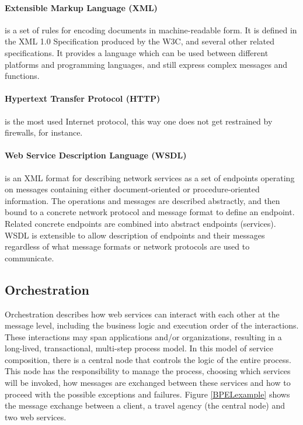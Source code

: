 \paragraph{Extensible Markup Language (XML)}
is a set of rules for encoding documents in machine-readable form. It is defined in the XML 1.0 Specification produced by the W3C, and several other related specifications. It provides a language which can be used between different platforms and programming languages, and still express complex messages and functions.

\paragraph{Hypertext Transfer Protocol (HTTP)} 
is the most used Internet protocol, this way one does not get restrained by firewalls, for instance.

\paragraph{Web Service Description Language (WSDL)}
is an XML format for describing network services as a set of endpoints operating on messages containing either document-oriented or procedure-oriented information. The operations and messages are described abstractly, and then bound to a concrete network protocol and message format to define an endpoint. Related concrete endpoints are combined into abstract endpoints (services). WSDL is extensible to allow description of endpoints and their messages regardless of what message formats or network protocols are used to communicate.

\subsection{Orchestration}
Orchestration describes how web services can interact with each other at the message level, including the business logic and execution order of the interactions. These interactions may span applications and/or organizations, resulting in a long-lived, transactional, multi-step process model. In this model of service composition, there is a central node that controls the logic of the entire process. This node has the responsibility to manage the process, choosing which services will be invoked, how messages are exchanged between these services and how to proceed with the possible exceptions and failures. Figure \ref{BPELexample} shows the message exchange between a client, a travel agency (the central node) and two web services.

